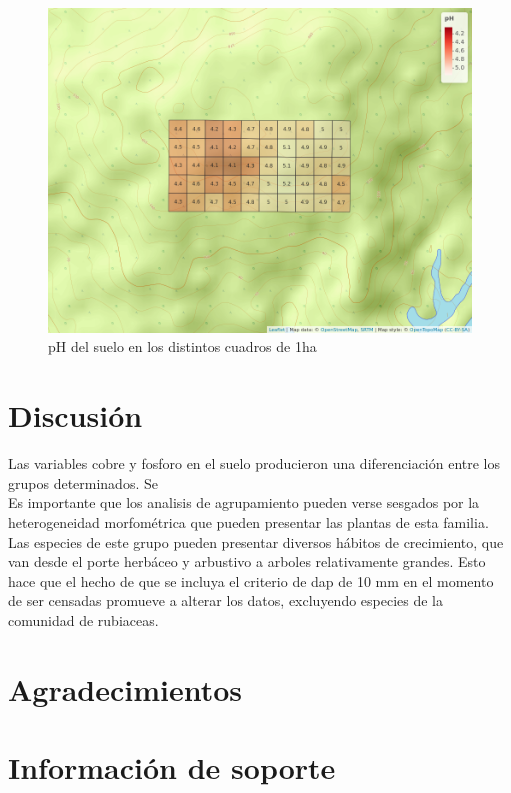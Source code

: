 \documentclass[11pt,]{article}
\begin{document}
\begin{figure}
\centering
\includegraphics{mapa_cuadros_ph.png}
\caption{pH del suelo en los distintos cuadros de 1ha
\label{fig:mapa_cuadros_ph}}
\end{figure}

\section{Discusión}\label{discusiuxf3n}

Las variables cobre y fosforo en el suelo producieron una diferenciación
entre los grupos determinados. Se\\
Es importante que los analisis de agrupamiento pueden verse sesgados por
la heterogeneidad morfométrica que pueden presentar las plantas de esta
familia. Las especies de este grupo pueden presentar diversos hábitos de
crecimiento, que van desde el porte herbáceo y arbustivo a arboles
relativamente grandes. Esto hace que el hecho de que se incluya el
criterio de dap de 10 mm en el momento de ser censadas promueve a
alterar los datos, excluyendo especies de la comunidad de rubiaceas.

\section{Agradecimientos}\label{agradecimientos}

\section{Información de soporte}\label{informaciuxf3n-de-soporte}
\end{document}
